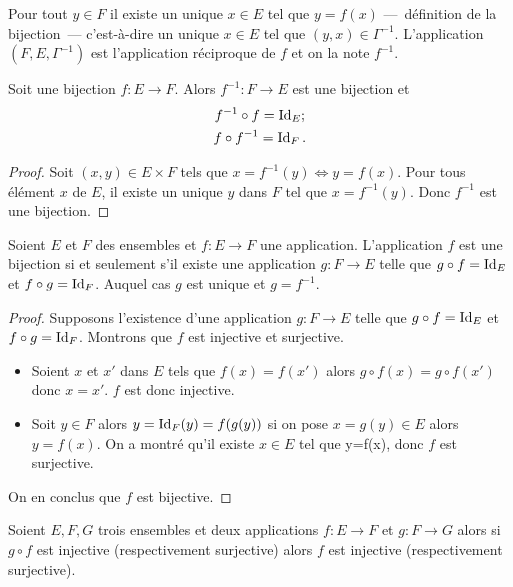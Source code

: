 Pour tout \(y \in F\) il existe un unique \(x \in E\) tel que \(y=f(x)\) ---~définition de la bijection~--- c'est-à-dire un unique \(x \in E\) tel que \((y,x) \in \Gamma^{-1}\). L'application \((F,E,\Gamma^{-1})\) est l'application réciproque de \(f\) et on la note \(f^{-1}\).
%
\begin{prop} Soit une bijection \(f : E \longrightarrow F\). Alors \(f^{-1} : F \longrightarrow E\) est une bijection et
  \begin{gather}
    f^{-1} \circ f =\operatorname{Id}_E; \\
    f \circ f^{-1}=\operatorname{Id}_F.
  \end{gather}
\end{prop}
\begin{proof}
Soit \((x,y) \in E \times F\) tels que \(x=f^{-1}(y) \iff y=f(x)\). Pour tous élément \(x\) de \(E\), il existe un unique \(y\) dans \(F\) tel que \(x=f^{-1}(y)\). Donc \(f^{-1}\) est une bijection.
\end{proof}
%
\begin{theo}
Soient \(E\) et \(F\) des ensembles et \(f:E \longrightarrow F\) une application. L'application \(f\) est une bijection si et seulement s'il existe une application \(g:F \longrightarrow E\) telle que \(g \circ f = \operatorname{Id}_E\) et \(f \circ g = \operatorname{Id}_F\). Auquel cas \(g\) est unique et \(g=f^{-1}\).
\end{theo}
\begin{proof}
  Supposons l'existence d'une application \(g:F \longrightarrow E\) telle que \(g \circ f = \operatorname{Id}_E\) et \(f \circ g = \operatorname{Id}_F\). Montrons que \(f\) est injective et surjective.
  \begin{itemize}
  \item Soient \(x\) et \(x'\) dans \(E\) tels que \(f(x)=f(x')\) alors \(g \circ f(x) = g \circ f(x')\) donc \(x=x'\). \(f\) est donc injective.
  \item Soit \(y \in F\) alors \(y=\operatorname{Id}_F(y)=f(g(y))\) si on pose \(x=g(y) \in E\) alors \(y=f(x)\). On a montré qu'il existe \(x \in E\) tel que y=f(x), donc \(f\) est surjective.
  \end{itemize}
  On en conclus que \(f\) est bijective.
\end{proof}
%
\begin{prop}
  Soient \(E,F,G\) trois ensembles et deux applications \(f:E \longrightarrow F\) et \(g:F \longrightarrow G\) alors si \(g \circ f\) est injective (respectivement surjective) alors \(f\) est injective (respectivement surjective).
\end{prop}
